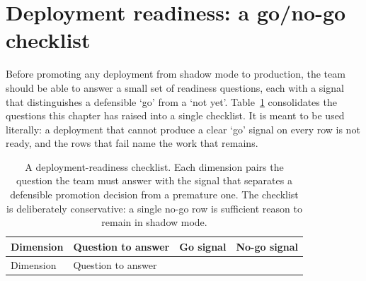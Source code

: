 \documentclass[
  letterpaper,
  11pt]{scrbook}
\begin{document}
\section{Deployment readiness: a go/no-go
checklist}\label{deployment-readiness-a-gono-go-checklist}

Before promoting any deployment from shadow mode to production, the team
should be able to answer a small set of readiness questions, each with a
signal that distinguishes a defensible `go' from a `not yet'.
Table~\ref{tbl-deployment-readiness} consolidates the questions this
chapter has raised into a single checklist. It is meant to be used
literally: a deployment that cannot produce a clear `go' signal on every
row is not ready, and the rows that fail name the work that remains.

\begin{longtable}[]{@{}
  >{\raggedright\arraybackslash}p{}
  >{\raggedright\arraybackslash}p{}
  >{\raggedright\arraybackslash}p{}
  >{\raggedright\arraybackslash}p{}@{}}
\caption{A deployment-readiness checklist. Each dimension pairs the
question the team must answer with the signal that separates a
defensible promotion decision from a premature one. The checklist is
deliberately conservative: a single no-go row is sufficient reason to
remain in shadow mode.}\label{tbl-deployment-readiness}\tabularnewline
\toprule\noalign{}
\begin{minipage}[b]{\linewidth}\raggedright
Dimension
\end{minipage} & \begin{minipage}[b]{\linewidth}\raggedright
Question to answer
\end{minipage} & \begin{minipage}[b]{\linewidth}\raggedright
Go signal
\end{minipage} & \begin{minipage}[b]{\linewidth}\raggedright
No-go signal
\end{minipage} \\
\midrule\noalign{}
\endfirsthead
\toprule\noalign{}
\begin{minipage}[b]{\linewidth}\raggedright
Dimension
\end{minipage} & \begin{minipage}[b]{\linewidth}\raggedright
Question to answer
\end{minipage} & \begin{minipage}[b]{\linewidth}\raggedright

\end{minipage}
\end{longtable}
\end{document}
